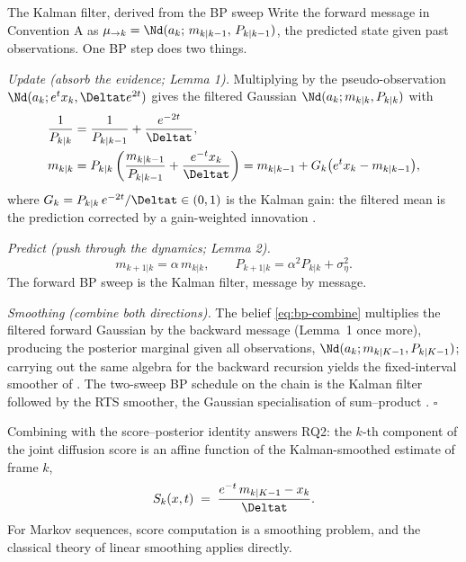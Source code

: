 \begin{toolbox}{The Kalman filter, derived from the BP sweep}
Write the forward message in Convention A as
$\mu_{\to k} = \Nd(a_k;\, m_{k|k-1},\, P_{k|k-1})$, the predicted state
given past observations. One BP step does two things.

\emph{Update (absorb the evidence; Lemma 1).} Multiplying by the
pseudo-observation $\Nd(a_k; e^t x_k, \Deltat e^{2t})$ gives the filtered
Gaussian $\Nd(a_k; m_{k|k}, P_{k|k})$ with
\begin{align*}
  \frac{1}{P_{k|k}} &= \frac{1}{P_{k|k-1}} + \frac{e^{-2t}}{\Deltat},\\
  m_{k|k} &= P_{k|k} \left( \frac{m_{k|k-1}}{P_{k|k-1}}
        + \frac{e^{-t} x_k}{\Deltat} \right)
  = m_{k|k-1} + G_k \big( e^{t} x_k - m_{k|k-1} \big),
\end{align*}
where $G_k = P_{k|k}\, e^{-2t}/\Deltat \in (0,1)$ is the Kalman gain: the
filtered mean is the prediction corrected by a gain-weighted innovation
\citep{kalman1960new}.

\emph{Predict (push through the dynamics; Lemma 2).}
\begin{equation*}
  m_{k+1|k} = \alpha\, m_{k|k},
  \qquad
  P_{k+1|k} = \alpha^2 P_{k|k} + \sigma_\eta^2 .
\end{equation*}
The forward BP sweep is the Kalman filter, message by message.

\emph{Smoothing (combine both directions).} The belief
\eqref{eq:bp-combine} multiplies the filtered forward Gaussian by the
backward message (Lemma~1 once more), producing the posterior marginal
given all observations, $\Nd(a_k; m_{k|K-1}, P_{k|K-1})$; carrying out
the same algebra for the backward recursion yields the fixed-interval
smoother of \citet{rauch1965maximum}. The two-sweep BP schedule on the
chain is the Kalman filter followed by the RTS smoother, the Gaussian
specialisation of sum--product \citep{kschischang2001factor,
bishop2006pattern}. \hfill$\square$
\end{toolbox}

Combining with the score--posterior identity answers RQ2: the $k$-th
component of the joint diffusion score is an affine function of the
Kalman-smoothed estimate of frame $k$,
\begin{equation}
  S_k(x, t)
  \;=\; \frac{e^{-t}\, m_{k|K-1} - x_k}{\Deltat} .
  \label{eq:bp-score-kalman}
\end{equation}
For Markov sequences, score computation is a smoothing problem, and the
classical theory of linear smoothing applies directly.

